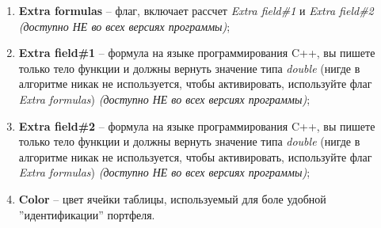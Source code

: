 \begin{enumerate}
	\item \textbf{Extra formulas} -- флаг, включает рассчет \textit{Extra field\#1} и \textit{Extra field\#2} \textit{(доступно НЕ во всех версиях программы)};
	\item \textbf{Extra field\#1} -- формула на языке программирования C++, вы пишете только тело функции
		и должны вернуть значение типа \textit{double} (нигде в алгоритме никак не используется, чтобы активировать, используйте флаг \textit{Extra formulas}) \textit{(доступно НЕ во всех версиях программы)};
	\item \textbf{Extra field\#2} -- формула на языке программирования C++, вы пишете только тело функции
		и должны вернуть значение типа \textit{double} (нигде в алгоритме никак не используется, чтобы активировать, используйте флаг \textit{Extra formulas}) \textit{(доступно НЕ во всех версиях программы)};
	\item \textbf{Color} -- цвет ячейки таблицы, используемый для боле удобной ''идентификации'' портфеля.
\end{enumerate}

